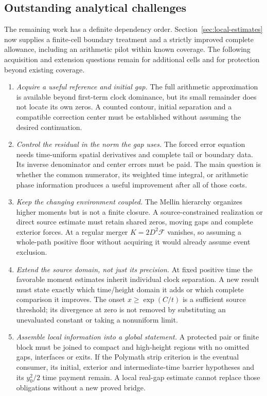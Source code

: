 \subsection{Outstanding analytical challenges}

The remaining work has a definite dependency order. Section~\ref{sec:local-estimates}
now supplies a finite-cell boundary treatment and a strictly improved
complete allowance, including an arithmetic pilot within known coverage.
The following acquisition and extension questions remain for additional
cells and for protection beyond existing coverage.

\begin{enumerate}
\item \emph{Acquire a useful reference and initial gap.}
The full arithmetic approximation is available beyond first-term clock
dominance, but its small remainder does not locate its own zeros.
A counted contour, initial separation and a compatible correction center
must be established without assuming the desired continuation.

\item \emph{Control the residual in the norm the gap uses.}
The forced error equation needs time-uniform spatial derivatives and
complete tail or boundary data. Its inverse denominator and center
errors must be paid. The main question is whether the common numerator,
its weighted time integral, or arithmetic phase information produces a
useful improvement after all of those costs.

\item \emph{Keep the changing environment coupled.}
The Mellin hierarchy organizes higher moments but is not a finite closure.
A source-constrained realization or direct source estimate must retain
shared zeros, moving gaps and complete exterior forces. At a regular
merger $K=2D^2\mathcal F$ vanishes, so assuming a whole-path positive
floor without acquiring it would already assume event exclusion.

\item \emph{Extend the source domain, not just its precision.}
At fixed positive time the favorable moment estimates inherit individual
clock separation. A new result must state exactly which time/height
domain it adds or which complete comparison it improves. The onset
$x\ge\exp(C/t)$ is a sufficient source threshold; its divergence at zero
is not removed by substituting an unevaluated constant or taking a
nonuniform limit.

\item \emph{Assemble local information into a global statement.}
A protected pair or finite block must be joined to compact and high-height
regions with no omitted gaps, interfaces or exits. If the Polymath strip
criterion is the eventual consumer, its initial, exterior and
intermediate-time barrier hypotheses and its $y_0^2/2$ time payment
remain. A local real-gap estimate cannot replace those obligations
without a new proved bridge.
\end{enumerate}

